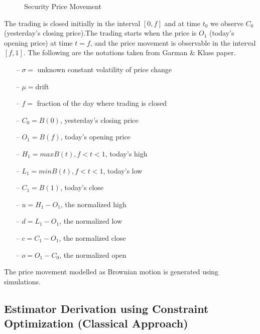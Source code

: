 \documentclass[12pt]{article}   	%
\begin{document}
\begin{figure}
	\centering
	\caption{Security Price Movement}
	\label{fig:SPM}
\end{figure}

\par The trading is closed initially in the interval $[0,f]$ and at time $t_0$ we observe $C_0$ (yesterday's closing price).The trading starts when the price is $O_1$ (today's opening price) at time $t=f$, and the price movement is observable in the interval $[f,1]$. The following are the notations taken from Garman \& Klass paper.


\begin{itemize}
	\item[--] $\sigma =$ unknown constant volatility of price change
\item[--]$\mu= $drift
\item[--] $f =$ fraction of the day where trading is closed
\item[--] $C_0 = B(0)$, yesterday's closing price
\item[--] $O_1 = B(f)$, today's opening price
\item[--] $H_1 = max B(t), f < t < 1$, today's high
\item[--] $L_1 = min B(t), f < t < 1$, today's low
\item[--] $C_1 = B(1)$, today's close
\item[--] $u = H_1 - O_1$, the normalized high
\item[--] $d = L_1 - O_1$, the normalized low
\item[--] $c = C_1 - O_1$, the normalized close
\item[--] $o = O_1 - C_0$, the normalized open

\end{itemize}
The price movement modelled as Brownian motion is generated using simulations. 


\subsection{Estimator Derivation using Constraint Optimization (Classical Approach)}
\end{document}
